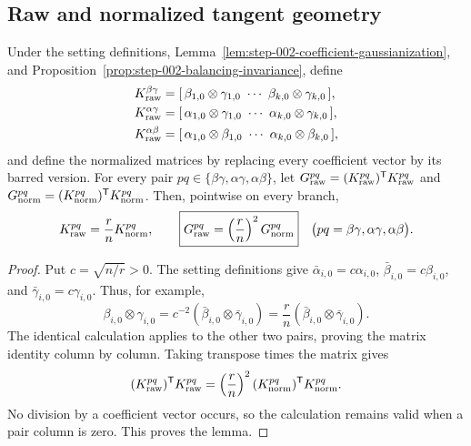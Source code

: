 \subsection{Raw and normalized tangent geometry}\label{app:step-005}

\begin{lemma}
\label{lem:step-005-pair-gram-scaling}
Under the setting definitions, Lemma~\ref{lem:step-002-coefficient-gaussianization}, and Proposition~\ref{prop:step-002-balancing-invariance}, define
\[
\begin{aligned}
  K_{\rm raw}^{\beta\gamma}
    &=[\,\beta_{1,0}\otimes\gamma_{1,0}\ \cdots\
          \beta_{k,0}\otimes\gamma_{k,0}\,],\\
  K_{\rm raw}^{\alpha\gamma}
    &=[\,\alpha_{1,0}\otimes\gamma_{1,0}\ \cdots\
          \alpha_{k,0}\otimes\gamma_{k,0}\,],\\
  K_{\rm raw}^{\alpha\beta}
    &=[\,\alpha_{1,0}\otimes\beta_{1,0}\ \cdots\
          \alpha_{k,0}\otimes\beta_{k,0}\,],
\end{aligned}
\]
and define the normalized matrices by replacing every coefficient vector by
its barred version. For every pair
\(pq\in\{\beta\gamma,\alpha\gamma,\alpha\beta\}\), let
\(G_{\rm raw}^{pq}=(K_{\rm raw}^{pq})^{\mathsf T}K_{\rm raw}^{pq}\) and
\(G_{\rm norm}^{pq}=(K_{\rm norm}^{pq})^{\mathsf T}K_{\rm norm}^{pq}\).
Then, pointwise on every branch,
\[
  K_{\rm raw}^{pq}=\frac rn K_{\rm norm}^{pq},
  \qquad
  \boxed{G_{\rm raw}^{pq}=\left(\frac rn\right)^2G_{\rm norm}^{pq}}
  \quad
  \bigl(pq=\beta\gamma,\alpha\gamma,\alpha\beta\bigr).
\]

\end{lemma}

\begin{proof}
Put \(c=\sqrt{n/r}>0\). The setting definitions
give \(\bar\alpha_{i,0}=c\alpha_{i,0}\),
\(\bar\beta_{i,0}=c\beta_{i,0}\), and
\(\bar\gamma_{i,0}=c\gamma_{i,0}\). Thus, for example,
\[
  \beta_{i,0}\otimes\gamma_{i,0}
  =c^{-2}(\bar\beta_{i,0}\otimes\bar\gamma_{i,0})
  =\frac rn(\bar\beta_{i,0}\otimes\bar\gamma_{i,0}).
\]
The identical calculation applies to the other two pairs, proving the matrix
identity column by column. Taking transpose times the matrix gives
\[
  (K_{\rm raw}^{pq})^{\mathsf T}K_{\rm raw}^{pq}
  =\left(\frac rn\right)^2
    (K_{\rm norm}^{pq})^{\mathsf T}K_{\rm norm}^{pq}.
\]
No division by a coefficient vector occurs, so the calculation remains valid
when a pair column is zero. This proves the lemma. 

\end{proof}


